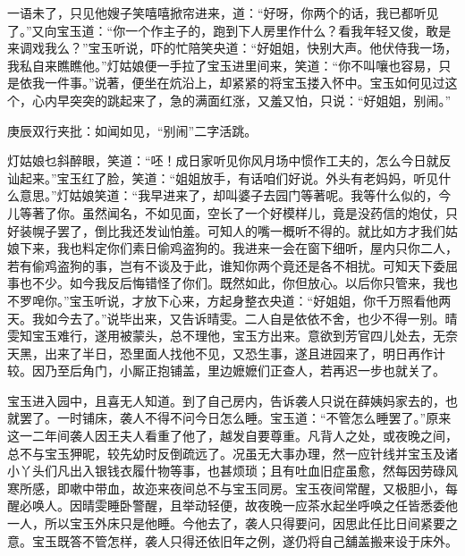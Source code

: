 \begin{parag}


    一语未了，只见他嫂子笑嘻嘻掀帘进来，道：“好呀，你两个的话，我已都听见了。”又向宝玉道：“你一个作主子的，跑到下人房里作什么？看我年轻又俊，敢是来调戏我么？”宝玉听说，吓的忙陪笑央道：“好姐姐，快别大声。他伏侍我一场，我私自来瞧瞧他。”灯姑娘便一手拉了宝玉进里间来，笑道：“你不叫嚷也容易，只是依我一件事。”说著，便坐在炕沿上，却紧紧的将宝玉搂入怀中。宝玉如何见过这个，心内早突突的跳起来了，急的满面红涨，又羞又怕，只说：“好姐姐，别闹。”\begin{note}庚辰双行夹批：如闻如见，“别闹”二字活跳。\end{note}灯姑娘乜斜醉眼，笑道：“呸！成日家听见你风月场中惯作工夫的，怎么今日就反讪起来。”宝玉红了脸，笑道：“姐姐放手，有话咱们好说。外头有老妈妈，听见什么意思。”灯姑娘笑道：“我早进来了，却叫婆子去园门等著呢。我等什么似的，今儿等著了你。虽然闻名，不如见面，空长了一个好模样儿，竟是没药信的炮仗，只好装幌子罢了，倒比我还发讪怕羞。可知人的嘴一概听不得的。就比如方才我们姑娘下来，我也料定你们素日偷鸡盗狗的。我进来一会在窗下细听，屋内只你二人，若有偷鸡盗狗的事，岂有不谈及于此，谁知你两个竟还是各不相扰。可知天下委屈事也不少。如今我反后悔错怪了你们。既然如此，你但放心。以后你只管来，我也不罗唣你。”宝玉听说，才放下心来，方起身整衣央道：“好姐姐，你千万照看他两天。我如今去了。”说毕出来，又告诉晴雯。二人自是依依不舍，也少不得一别。晴雯知宝玉难行，遂用被蒙头，总不理他，宝玉方出来。意欲到芳官四儿处去，无奈天黑，出来了半日，恐里面人找他不见，又恐生事，遂且进园来了，明日再作计较。因乃至后角门，小厮正抱铺盖，里边嬷嬷们正查人，若再迟一步也就关了。
\end{parag}


\begin{parag}


    宝玉进入园中，且喜无人知道。到了自己房内，告诉袭人只说在薛姨妈家去的，也就罢了。一时铺床，袭人不得不问今日怎么睡。宝玉道：“不管怎么睡罢了。”原来这一二年间袭人因王夫人看重了他了，越发自要尊重。凡背人之处，或夜晚之间，总不与宝玉狎昵，较先幼时反倒疏远了。况虽无大事办理，然一应针线并宝玉及诸小丫头们凡出入银钱衣履什物等事，也甚烦琐；且有吐血旧症虽愈，然每因劳碌风寒所感，即嗽中带血，故迩来夜间总不与宝玉同房。宝玉夜间常醒，又极胆小，每醒必唤人。因晴雯睡卧警醒，且举动轻便，故夜晚一应茶水起坐呼唤之任皆悉委他一人，所以宝玉外床只是他睡。今他去了，袭人只得要问，因思此任比日间紧要之意。宝玉既答不管怎样，袭人只得还依旧年之例，遂仍将自己舖盖搬来设于床外。
\end{parag}


